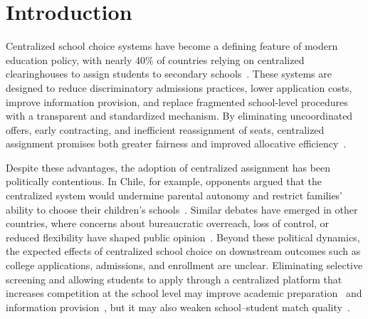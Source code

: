\documentclass[11pt]{article}
\begin{document}
\section{Introduction}

Centralized school choice systems have become a defining feature of modern education policy, with nearly 40\% of countries relying on centralized clearinghouses to assign students to secondary schools~\cite{ccas_2024}. These systems are designed to reduce discriminatory admissions practices, lower application costs, improve information provision, and replace fragmented school-level procedures with a transparent and standardized mechanism. By eliminating uncoordinated offers, early contracting, and inefficient reassignment of seats, centralized assignment promises both greater fairness and improved allocative efficiency~\citep{Roth1990}. 

Despite these advantages, the adoption of centralized assignment has been politically contentious. In Chile, for example, opponents argued that the centralized system would undermine parental autonomy and restrict families' ability to choose their children's schools~\citep{rebolledo2018}. Similar debates have emerged in other countries, where concerns about bureaucratic overreach, loss of control, or reduced flexibility have shaped public opinion~\citep{fox5ny_lottery_2022, sfstandard_lottery_2026, guardian_brighton_lottery_2017}. Beyond these political dynamics, the expected effects of centralized school choice on downstream outcomes such as college applications, admissions, and enrollment are unclear. Eliminating selective screening and allowing students to apply through a centralized platform that increases competition at the school level may improve academic preparation~\citep{camposkearns2024} and information provision~\citep{arteaga2022smart}, but it may also weaken school--student match quality~\citep{KaufmanRosenbaum1992, cullen2006, LightStrayer2000}. 

\end{document}
